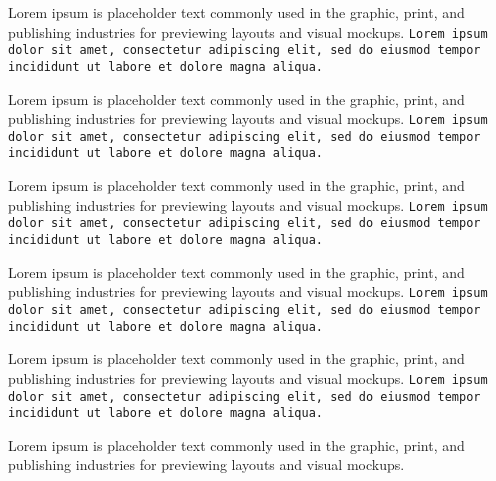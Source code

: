 \documentclass[11pt]{ctexart}
\begin{document}
Lorem ipsum is placeholder text commonly used in the graphic, print, and publishing industries for previewing layouts and visual mockups.
\texttt{Lorem ipsum dolor sit amet, consectetur adipiscing elit, sed do eiusmod tempor incididunt ut labore et dolore magna aliqua.}

Lorem ipsum is placeholder text commonly used in the graphic, print, and publishing industries for previewing layouts and visual mockups.
\texttt{Lorem ipsum dolor sit amet, consectetur adipiscing elit, sed do eiusmod tempor incididunt ut labore et dolore magna aliqua.}

Lorem ipsum is placeholder text commonly used in the graphic, print, and publishing industries for previewing layouts and visual mockups.
\texttt{Lorem ipsum dolor sit amet, consectetur adipiscing elit, sed do eiusmod tempor incididunt ut labore et dolore magna aliqua.}

Lorem ipsum is placeholder text commonly used in the graphic, print, and publishing industries for previewing layouts and visual mockups.
\texttt{Lorem ipsum dolor sit amet, consectetur adipiscing elit, sed do eiusmod tempor incididunt ut labore et dolore magna aliqua.}

Lorem ipsum is placeholder text commonly used in the graphic, print, and publishing industries for previewing layouts and visual mockups.
\texttt{Lorem ipsum dolor sit amet, consectetur adipiscing elit, sed do eiusmod tempor incididunt ut labore et dolore magna aliqua.}

Lorem ipsum is placeholder text commonly used in the graphic, print, and publishing industries for previewing layouts and visual mockups.
\end{document}
